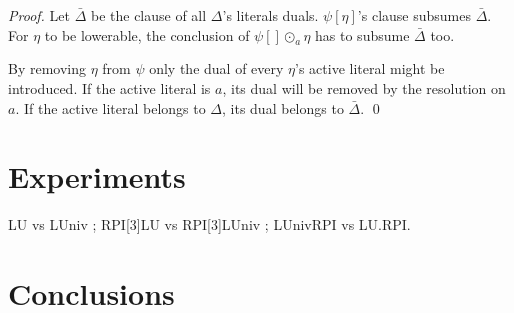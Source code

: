 \documentclass{llncs}
\newenvironment{jogo}{\color{teal}}{}
\begin{document}
\begin{proof}
Let $\bar{\Delta}$ be the clause of all $\Delta$'s literals duals.
$\psi[\eta]$'s clause subsumes $\bar{\Delta}$. For $\eta$ to be lowerable,
the conclusion of $\psi[] \odot_a \eta$ has to subsume $\bar{\Delta}$ too.

By removing $\eta$ from $\psi$ only the dual of every $\eta$'s active literal
might be introduced. If the active literal is $a$, its dual will be removed
by the resolution on $a$. If the active literal belongs to $\Delta$, its
dual belongs to $\bar{\Delta}$.
\qed
\end{proof}

\section{Experiments}

\begin{jogo}
LU vs LUniv ; RPI[3]LU vs RPI[3]LUniv ; LUnivRPI vs LU.RPI.
\end{jogo}

\section{Conclusions}



\end{document}
